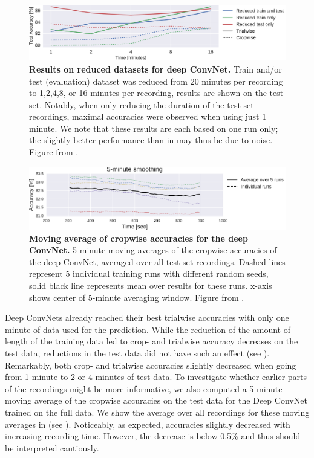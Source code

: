 \begin{figure}[htbp]
\myfloatalign
\includegraphics[width=\linewidth]{images/Time_Plot.pdf-1.png}
\caption[Results on reduced datasets for deep ConvNet]{\textbf{Results on reduced datasets for deep ConvNet.} Train and/or test (evaluation) dataset was reduced from 20 minutes per recording to 1,2,4,8, or 16 minutes per recording, results are shown on the test set. Notably, when only reducing the duration of the test set recordings, maximal accuracies were observed  when using just 1 minute. We note that these results are each based on one run only; the slightly better performance than in  may thus be due to noise. Figure from \citet{schirrmeisterdeeppathology}.}
\label{pathology-time-fig}
\end{figure}

\begin{figure}[htbp]
\myfloatalign
\includegraphics[width=\linewidth]{images/Time_Crop_Pred_Plot.pdf-1.png}
\caption[Moving average of cropwise accuracies for the deep ConvNet.]{\textbf{Moving average of cropwise accuracies for the deep ConvNet.}
5-minute moving averages of the cropwise accuracies of the deep ConvNet, averaged over all test set recordings.
Dashed lines represent 5 individual training runs with different random seeds, solid black line represents mean over results for these runs.
x-axis shows center of 5-minute averaging window.
Figure from \citet{schirrmeisterdeeppathology}.}
\label{time-crop-pred-fig}
\end{figure}

    Deep ConvNets already reached their best trialwise accuracies with only
one minute of data used for the prediction. While the reduction of the
amount of length of the training data led to crop- and trialwise
accuracy decreases on the test data, reductions in the test data did not
have such an effect (see ).
Remarkably, both crop- and trialwise accuracies slightly decreased when
going from 1 minute to 2 or 4 minutes of test data. To investigate
whether earlier parts of the recordings might be more informative, we
also computed a 5-minute moving average of the cropwise accuracies on
the test data for the Deep ConvNet trained on the full data. We show the
average over all recordings for these moving averages in (see
). Noticeably, as expected,
accuracies slightly decreased with increasing recording time. However,
the decrease is below 0.5\% and thus should be interpreted cautiously.

